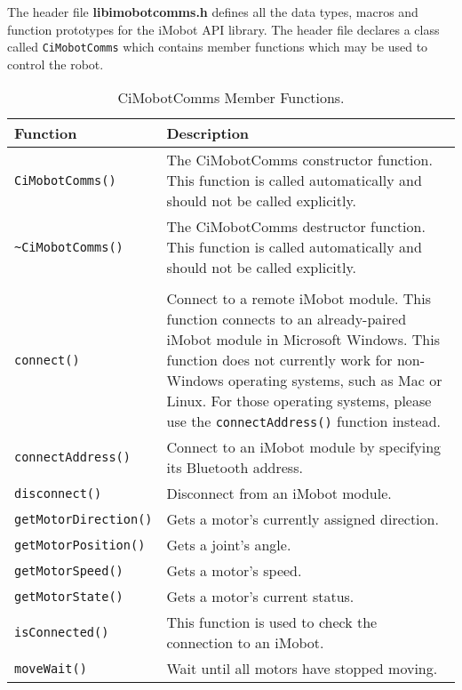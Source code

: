\noindent
The header file {\bf libimobotcomms.h} defines all the data types, macros 
and function prototypes for the iMobot API library. The header file
declares a class called \texttt{CiMobotComms} which contains member functions which
may be used to control the robot.

\begin{table}[!hp]
\begin{center}
\caption{CiMobotComms Member Functions.}
\begin{tabular}{p{38 mm}p{77 mm}}
\hline
Function & Description \\
\hline
\texttt{CiMobotComms()} \dotfill & The CiMobotComms constructor function. This function
is called automatically and should not be called explicitly. \\
\texttt{\textasciitilde CiMobotComms()} \dotfill & The CiMobotComms destructor function. This function
is called automatically and should not be called explicitly. \\
& \\
\texttt{connect()} \dotfill & Connect to a remote iMobot module. This function connects to an already-paired iMobot module in Microsoft Windows. This function does not currently work for non-Windows operating systems, such as Mac or Linux. For those operating systems, please use the \texttt{connectAddress()} function instead. \\
\texttt{connectAddress()} \dotfill & Connect to an iMobot module by specifying its Bluetooth address. \\
\texttt{disconnect()} \dotfill & Disconnect from an iMobot module. \\
\texttt{getMotorDirection()} \dotfill & Gets a motor's currently assigned direction. \\
\texttt{getMotorPosition()} \dotfill & Gets a joint's angle. \\
\texttt{getMotorSpeed()} \dotfill & Gets a motor's speed. \\
\texttt{getMotorState()} \dotfill & Gets a motor's current status. \\
\texttt{isConnected()} \dotfill & This function is used to check the connection to an iMobot. \\
\texttt{moveWait()} \dotfill & Wait until all motors have stopped moving. \\

\end{tabular}
\end{center}
\end{table}
